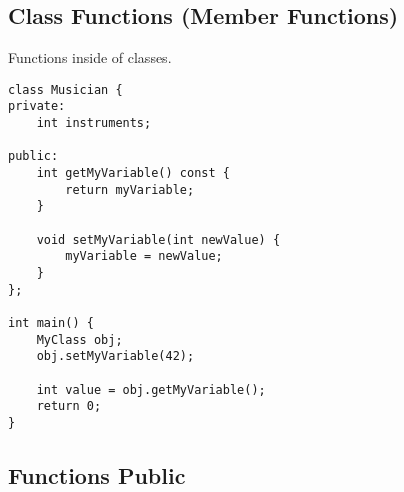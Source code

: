 \subsection{Class Functions (Member Functions)}

Functions inside of classes.

\begin{verbatim}
class Musician {
private:
    int instruments;

public:
    int getMyVariable() const {
        return myVariable;
    }

    void setMyVariable(int newValue) {
        myVariable = newValue;
    }
};

int main() {
    MyClass obj;
    obj.setMyVariable(42);

    int value = obj.getMyVariable();
    return 0;
}
\end{verbatim}

\subsection{Functions Public}


